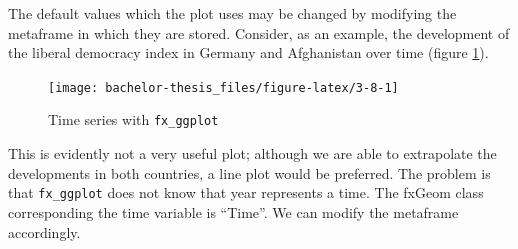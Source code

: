 \documentclass[]{report}
\newenvironment{Shaded}{\begin{snugshade}}{\end{snugshade}}
\newcommand{\KeywordTok}[1]{\textcolor[rgb]{0.13,0.29,0.53}{\textbf{#1}}}
\newcommand{\DataTypeTok}[1]{\textcolor[rgb]{0.13,0.29,0.53}{#1}}
\newcommand{\StringTok}[1]{\textcolor[rgb]{0.31,0.60,0.02}{#1}}
\newcommand{\OperatorTok}[1]{\textcolor[rgb]{0.81,0.36,0.00}{\textbf{#1}}}
\newcommand{\NormalTok}[1]{#1}
\theoremstyle{definition}
\theoremstyle{definition}
\theoremstyle{definition}
\theoremstyle{remark}
\begin{document}
The default values which the plot uses may be changed by modifying the
metaframe in which they are stored. Consider, as an example, the
development of the liberal democracy index in Germany and Afghanistan
over time (figure \ref{fig:3-8}).

\begin{Shaded}
\end{Shaded}

\begin{figure}

{\centering \texttt{[image: bachelor-thesis\_files/figure-latex/3-8-1]} 

}

\caption{Time series with \texttt{fx\_ggplot}}\label{fig:3-8}
\end{figure}



This is evidently not a very useful plot; although we are able to
extrapolate the developments in both countries, a line plot would be
preferred. The problem is that \texttt{fx\_ggplot} does not know that
year represents a time. The fxGeom class corresponding the time variable
is ``Time''. We can modify the metaframe accordingly.
\end{document}
